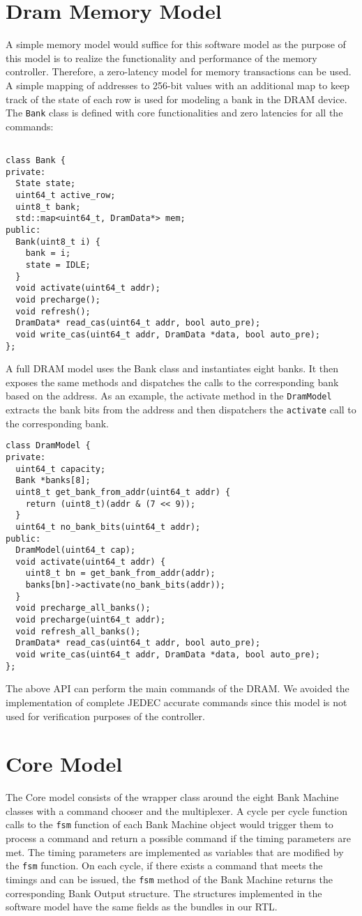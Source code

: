 \section{Dram Memory Model}
A simple memory model would suffice for this software model as the purpose of this model is to realize the functionality and performance of the memory controller. Therefore, a zero-latency model for memory transactions can be used. A simple mapping of addresses to 256-bit values with an additional map to keep track of the state of each row is used for modeling a bank in the DRAM device. The \verb|Bank| class is defined with core functionalities and zero latencies for all the commands: 
\begin{verbatim}

class Bank {
private:
  State state;
  uint64_t active_row;
  uint8_t bank;
  std::map<uint64_t, DramData*> mem;
public: 
  Bank(uint8_t i) {
    bank = i;
    state = IDLE;
  }
  void activate(uint64_t addr);
  void precharge();
  void refresh();
  DramData* read_cas(uint64_t addr, bool auto_pre);
  void write_cas(uint64_t addr, DramData *data, bool auto_pre);
};
\end{verbatim}
A full DRAM model uses the Bank class and instantiates eight banks. It then exposes the same methods and dispatches the calls to the corresponding bank based on the address. As an example, the activate method in the \verb|DramModel| extracts the bank bits from the address and then dispatchers the \verb|activate| call to the corresponding bank.
\begin{verbatim}
class DramModel {
private:
  uint64_t capacity;
  Bank *banks[8];
  uint8_t get_bank_from_addr(uint64_t addr) {
    return (uint8_t)(addr & (7 << 9));
  }
  uint64_t no_bank_bits(uint64_t addr);
public:
  DramModel(uint64_t cap);
  void activate(uint64_t addr) {
    uint8_t bn = get_bank_from_addr(addr);
    banks[bn]->activate(no_bank_bits(addr));
  }
  void precharge_all_banks();
  void precharge(uint64_t addr);
  void refresh_all_banks();
  DramData* read_cas(uint64_t addr, bool auto_pre);
  void write_cas(uint64_t addr, DramData *data, bool auto_pre);
};
\end{verbatim}
The above API can perform the main commands of the DRAM. We avoided the implementation of complete JEDEC accurate commands since this model is not used for verification purposes of the controller.
\section{Core Model}
The Core model consists of the wrapper class around the eight Bank Machine classes with a command chooser and the multiplexer. A cycle per cycle function calls to the \verb|fsm| function of each Bank Machine object would trigger them to process a command and return a possible command if the timing parameters are met. The timing parameters are implemented as variables that are modified by the \verb|fsm| function. On each cycle, if there exists a command that meets the timings and can be issued, the \verb|fsm| method of the Bank Machine returns the corresponding Bank Output structure. The structures implemented in the software model have the same fields as the bundles in our RTL. 

